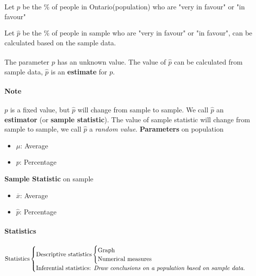 \documentclass[11pt]{article}
\begin{document}
	Let $p$ be the \% of people in Ontario(population) who are "very in favour" or "in favour"
	
	Let $\hat{p}$ be the \% of people in sample who are "very in favour" or "in favour", can be calculated based on the sample data.
	
	\paragraph{}The parameter $p$ has an unknown value. The value of $\hat{p}$ can be calculated from sample data, $\hat{p}$ is an \textbf{estimate} for $p$.
	
	\paragraph{Note} $p$ is a fixed value, but $\hat{p}$ will change from sample to sample. We call $\hat{p}$ an \textbf{estimator} (or \textbf{sample statistic}). The value of sample statistic will change from sample to sample, we call $\hat{p}$ a \emph{random value}.
	\newline \quad
	\newline
	\textbf{Parameters} on population
	\begin{itemize}
		\item $\mu$: Average
		\item $p$: Percentage
	\end{itemize}
	\textbf{Sample Statistic} on sample
	\begin{itemize}
		\item $\overline{x}$: Average
		\item $\hat{p}$: Percentage
	\end{itemize}
	\paragraph{Statistics}
	\[
	\text{Statistics}
		\begin{cases}
			\text{Descriptive statistics}
				\begin{cases}
					\text{Graph} \\
					\text{Numerical measures} \\
				\end{cases}
			\\
			\text{Inferential statistics: \emph{Draw conclusions on a population based on sample data.}} \\
		\end{cases}
	\]
\end{document}
